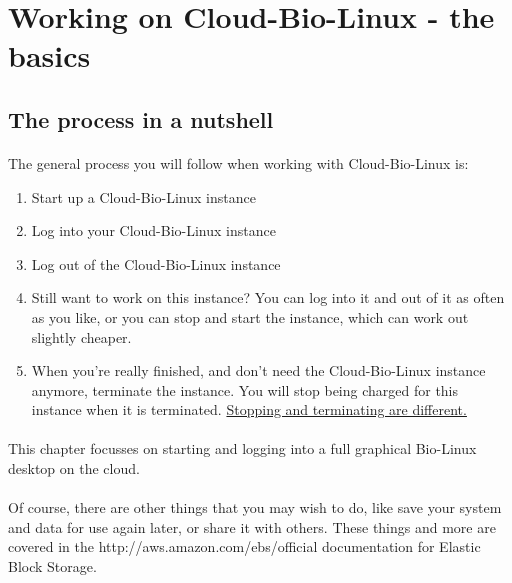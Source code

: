 \section{Working on Cloud-Bio-Linux - the basics}

\subsection{The process in a nutshell}
\paragraph{}The general process you will follow when working with Cloud-Bio-Linux is:
\begin{enumerate}
\item Start up a Cloud-Bio-Linux instance
\item Log into your Cloud-Bio-Linux instance
\item Log out of the  Cloud-Bio-Linux instance
\item Still want to work on this instance? You can log into it and out of it as often as you like, or you can stop and start the instance, which can work out slightly cheaper.
\item When you're really finished, and don't need the Cloud-Bio-Linux instance anymore, terminate the instance. You will stop being charged for this instance when it is terminated. \href{http://support.rightscale.com/06-FAQs/FAQ\_0149\_-_What\%27s_the_difference_between_Terminating_and_Stopping_an_EC2_Instance\%3F}{Stopping and terminating are different.}
\end{enumerate}

\paragraph{}This chapter focusses on starting and logging into a full graphical Bio-Linux desktop on the cloud.

\paragraph{}Of course, there are other things that you may wish to do, like save your system and data for use again later, or share it with others. These things and more are covered in the {http://aws.amazon.com/ebs/}{official documentation for Elastic Block Storage}.


